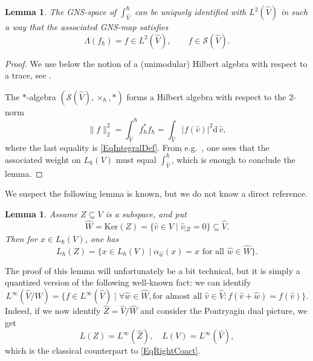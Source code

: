 \documentclass[11pt, reqno]{amsart}
\newtheorem{lemma}[theorem]{Lemma}
\theoremstyle{definition}
\numberwithin{equation}{section}
\def\Sc{\mathcal S}
\newcommand{\rd}{\mathrm{d}\!\,}
\newcommand{\Ker}{\mathrm{Ker}}
\begin{document}
\begin{lemma}\label{LemIdentGNS}
The GNS-space of $\int_{\hat{V}}^{\hbar}$ can be uniquely identified with $L^2(\hat{V})$ in such a way that the associated GNS-map satisfies
\begin{equation}\label{EqGNSIdent}
\Lambda(f_{\hbar}) = f\in L^2(\hat{V}),\qquad f\in \Sc(\hat{V}). 
\end{equation}
\end{lemma}
\begin{proof}
We use below the notion of a (unimodular) Hilbert algebra with respect to a trace, see \cite[Chapter VI]{Tak03}.

The $*$-algebra $(\mathcal{S}(\hat{V}),\times_{\hbar},*)$ forms a Hilbert algebra with respect to the $2$-norm
\[
\|f\|_2^2 = \int_{\hat{V}}^{\hbar} f_{\hbar}^*f_{\hbar} = \int_{\hat{V}} |f(\hat{v})|^2\rd \hat{v}, 
\]
where the last equality is \eqref{EqIntegralDef}. From e.g.\ \cite[Proposition VIII.3.16]{Tak03}, one sees that the associated weight on $L_{\hbar}(V)$ must equal $\int_{\hat{V}}^{\hbar}$, which is enough to conclude the lemma. 
\end{proof}

We suspect the following lemma is known, but we do not know a direct reference. 
\begin{lemma}\label{LemCharCorrSub}
Assume $Z \subseteq V$ is a subspace, and put 
\[
\hat{W} = \Ker(Z) = \{\hat{v}\in \hat{V}\mid \hat{v}_{\mid Z} = 0\}\subseteq \hat{V}.
\]
Then for $x \in L_{\hbar}(V)$, one has 
\begin{equation}\label{EqRightCoact}
L_{\hbar}(Z) = \{x\in L_{\hbar}(V) \mid \alpha_{\hat{w}}(x) = x\textrm{ for all }\hat{w}\in \hat{W}\}.
\end{equation}
\end{lemma}

The proof of this lemma will unfortunately be a bit technical, but it is simply a quantized version of the following well-known fact: we can identify
\[
L^{\infty}(\hat{V}/\hat{W}) = \{f\in L^{\infty}(\hat{V})\mid \forall \hat{w}\in \hat{W}, \textrm{for almost all }\hat{v}\in \hat{V}: f(\hat{v}+\hat{w}) = f(\hat{v})\}. 
\]
Indeed, if we now identify $\hat{Z}= \hat{V}/\hat{W}$ and consider the Pontryagin dual picture, we get 
\[
L(Z) = L^{\infty}(\hat{Z}),\quad L(V) = L^{\infty}(\hat{V}),
\]
which is the classical counterpart to \eqref{EqRightCoact}.
\end{document}
